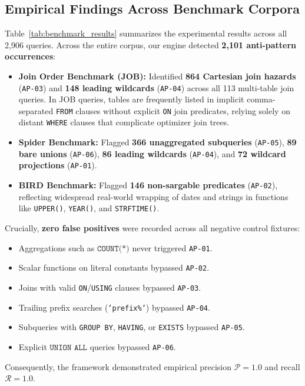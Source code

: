 \documentclass[conference]{IEEEtran}
\begin{document}
\subsection{Empirical Findings Across Benchmark Corpora}
Table~\ref{tab:benchmark_results} summarizes the experimental results across all 2,906 queries. Across the entire corpus, our engine detected \textbf{2,101 anti-pattern occurrences}:
\begin{itemize}
    \item \textbf{Join Order Benchmark (JOB):} Identified \textbf{864 Cartesian join hazards} (\texttt{AP-03}) and \textbf{148 leading wildcards} (\texttt{AP-04}) across all 113 multi-table join queries. In JOB queries, tables are frequently listed in implicit comma-separated \texttt{FROM} clauses without explicit \texttt{ON} join predicates, relying solely on distant \texttt{WHERE} clauses that complicate optimizer join trees.
    \item \textbf{Spider Benchmark:} Flagged \textbf{366 unaggregated subqueries} (\texttt{AP-05}), \textbf{89 bare unions} (\texttt{AP-06}), \textbf{86 leading wildcards} (\texttt{AP-04}), and \textbf{72 wildcard projections} (\texttt{AP-01}).
    \item \textbf{BIRD Benchmark:} Flagged \textbf{146 non-sargable predicates} (\texttt{AP-02}), reflecting widespread real-world wrapping of dates and strings in functions like \texttt{UPPER()}, \texttt{YEAR()}, and \texttt{STRFTIME()}.
\end{itemize}

Crucially, \textbf{zero false positives} were recorded across all negative control fixtures:
\begin{itemize}
    \item Aggregations such as $\texttt{COUNT(*)}$ never triggered \texttt{AP-01}.
    \item Scalar functions on literal constants bypassed \texttt{AP-02}.
    \item Joins with valid \texttt{ON}/\texttt{USING} clauses bypassed \texttt{AP-03}.
    \item Trailing prefix searches (\texttt{'prefix\%'}) bypassed \texttt{AP-04}.
    \item Subqueries with \texttt{GROUP BY}, \texttt{HAVING}, or \texttt{EXISTS} bypassed \texttt{AP-05}.
    \item Explicit $\texttt{UNION ALL}$ queries bypassed \texttt{AP-06}.
\end{itemize}
Consequently, the framework demonstrated empirical precision $\mathcal{P} = 1.0$ and recall $\mathcal{R} = 1.0$.
\end{document}
